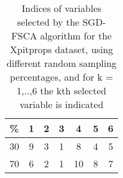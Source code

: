\begin{table}
	\begin{center}
		\begin{tabular}{c c c c c c c}
			\% & 1 & 2 & 3 & 4 & 5 & 6 \\
			\hline
			30 & 9 & 3 & 1 & 8 & 4 & 5 \\
			70 & 6 & 2 & 1 & 10 & 8 & 7 \\
		\end{tabular}
	\end{center}
	\caption{Indices of variables selected by the SGD-FSCA algorithm for the Xpitprops dataset, using different random sampling percentages, and for k = 1,..,6 the kth selected variable is indicated}
\end{table}